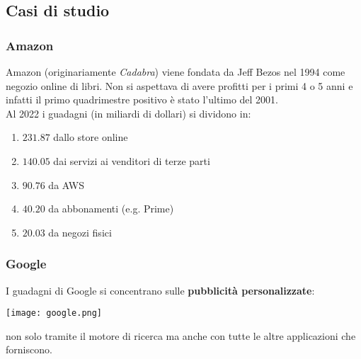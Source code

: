 \subsection{Casi di studio}
\subsubsection{Amazon}
Amazon (originariamente \textit{Cadabra}) viene fondata da Jeff Bezos nel 1994 come negozio online di libri. Non si aspettava di avere profitti per i primi 4 o 5 anni e infatti il primo quadrimestre positivo è stato l'ultimo del 2001.\\
Al 2022 i guadagni (in miliardi di dollari) si dividono in:
\begin{enumerate}
	\item $231.87$ dallo store online
	\item $140.05$ dai servizi ai venditori di terze parti
	\item $90.76$ da AWS
	\item $40.20$ da abbonamenti (e.g. Prime)
	\item $20.03$ da negozi fisici
\end{enumerate}
\subsubsection{Google}
I guadagni di Google si concentrano sulle \textbf{pubblicità personalizzate}:
\begin{center}
	\texttt{[image: google.png]}
\end{center}
non solo tramite il motore di ricerca ma anche con tutte le altre applicazioni che forniscono.